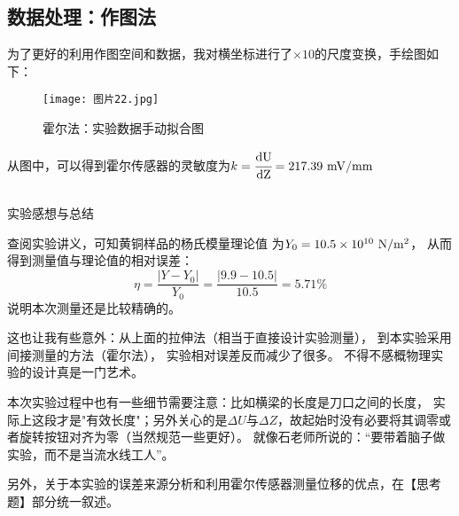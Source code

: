 \documentclass[11pt]{article}
\begin{document}
\subsection{数据处理：作图法}

为了更好的利用作图空间和数据，我对横坐标进行了$\times 10$的尺度变换，手绘图如下：
\begin{figure}[H]
    \centering
    \texttt{[image: 图片22.jpg]}
    \caption{霍尔法：实验数据手动拟合图}
\end{figure}
从图中，可以得到霍尔传感器的灵敏度为$k=\cfrac{\rm dU}{\rm dZ}=217.39\,\, {\rm mV/mm}$


\subsection[霍尔法测量杨氏模量：实验总结 ]{}
\begin{center}
    \begin{tcolorbox}[colback=gray!10,%
                      colframe=black,%
                      width=5cm,%
                      arc=1mm, auto outer arc,
                      boxrule=0.5pt,
                     ]
                     \begin{center}
                    实验感想与总结      
                     \end{center}
    \end{tcolorbox}
\end{center}

查阅实验讲义，可知黄铜样品的杨氏模量理论值
为$Y_0=10.5\times10^{10}\,\,{\rm N/m^2}$，
从而得到测量值与理论值的相对误差：
\[
   \eta=\frac{|Y-Y_0|}{Y_0}=\frac{|9.9-10.5|}{10.5}=5.71\% 
\]
说明本次测量还是比较精确的。

这也让我有些意外：从上面的拉伸法（相当于直接设计实验测量），
到本实验采用间接测量的方法（霍尔法），
实验相对误差反而减少了很多。
不得不感概物理实验的设计真是一门艺术。

本次实验过程中也有一些细节需要注意：比如横梁的长度是刀口之间的长度，
实际上这段才是"有效长度"；另外关心的是$\Delta U$与$\Delta Z$，故起始时没有必要将其调零或者旋转按钮对齐为零（当然规范一些更好）。
就像石老师所说的：“要带着脑子做实验，而不是当流水线工人”。

另外，关于本实验的误差来源分析和利用霍尔传感器测量位移的优点，在【思考题】部分统一叙述。
\end{document}
